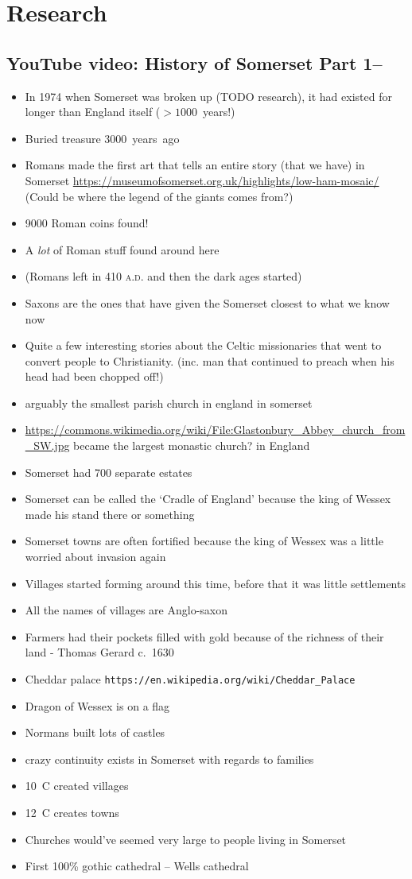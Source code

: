 \documentclass[twocolumn]{memoir}
\begin{document}
\chapter{Research}
\section{YouTube video: History of Somerset Part 1--}
\begin{itemize}
\item In 1974 when Somerset was broken up (TODO research), it had existed for longer than England itself (\(>1000\)~years!)
\item Buried treasure 3000~years~ago
\item Romans made the first art that tells an entire story (that we have) in Somerset \url{https://museumofsomerset.org.uk/highlights/low-ham-mosaic/} (Could be where the legend of the giants comes from?)
\item 9000 Roman coins found!
\item A \emph{lot} of Roman stuff found around here
\item (Romans left in 410 \textsc{a.d.} and then the dark ages started)
\item Saxons are the ones that have given the Somerset closest to what we know now
\item Quite a few interesting stories about the Celtic missionaries that went to convert people to Christianity. (inc. man that continued to preach when his head had been chopped off!)
\item arguably the smallest parish church in england in somerset
\item \url{https://commons.wikimedia.org/wiki/File:Glastonbury_Abbey_church_from_SW.jpg} became the largest monastic church? in England
\item Somerset had 700 separate estates 
\item Somerset can be called the `Cradle of England' because the king of Wessex made his stand there or something
\item Somerset towns are often fortified because the king of Wessex was a little worried about invasion again
\item Villages started forming around this time, before that it was little settlements
\item All the names of villages are Anglo-saxon
\item Farmers had their pockets filled with gold because of the richness of their land - Thomas Gerard c.~1630
\item Cheddar palace \verb|https://en.wikipedia.org/wiki/Cheddar_Palace|
\item Dragon of Wessex is on a flag
\item Normans built lots of castles
\item crazy continuity exists in Somerset with regards to families
\item 10~C created villages
\item 12~C creates towns
\item Churches would've seemed very large to people living in Somerset
\item First 100\% gothic cathedral -- Wells cathedral 
\end{itemize}
\end{document}
